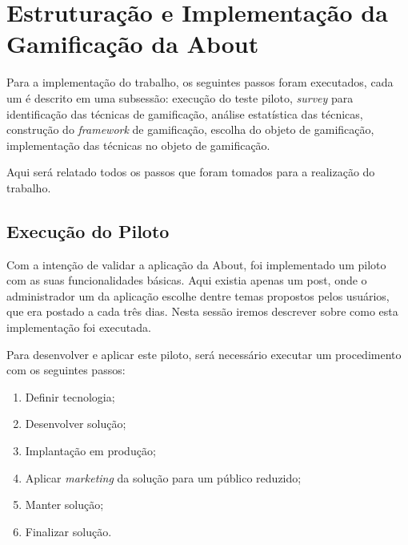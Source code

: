 \chapter[Estruturação e Implementação da Gamificação da About]{Estruturação e Implementação da Gamificação da About}

Para a implementação do trabalho, os seguintes
passos foram executados, cada um é
descrito em uma subsessão: execução do teste piloto, \textit{survey} para identificação das técnicas de gamificação,
análise estatística das técnicas, construção do \textit{framework} de gamificação, escolha do objeto de gamificação,
implementação das técnicas no objeto de gamificação.

Aqui será relatado todos os passos que foram tomados para a realização do trabalho.




\section{Execução do Piloto}
\label{sec:execucao_do_piloto}
Com a intenção de validar a aplicação da About, foi implementado um piloto com as suas funcionalidades
básicas. Aqui existia apenas um post, onde o administrador um da aplicação escolhe dentre temas propostos
pelos usuários, que era postado a cada três dias.
Nesta sessão iremos descrever sobre como esta implementação foi executada.

Para desenvolver e aplicar este piloto, será necessário executar um procedimento
com os seguintes passos:

\begin{enumerate}
    \item Definir tecnologia;
    \item Desenvolver solução;
    \item Implantação em produção;
    \item Aplicar \textit{marketing} da solução para um público reduzido;
    \item Manter solução;
    \item Finalizar solução.
\end{enumerate}


